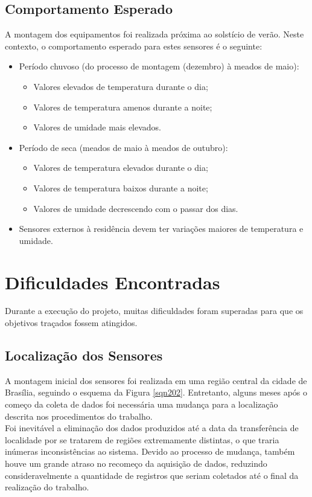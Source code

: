 
\subsection{Comportamento Esperado}
\quad A montagem dos equipamentos foi realizada próxima ao solstício de verão. Neste contexto, o comportamento esperado para estes sensores é o seguinte:
\begin{itemize}
  \item Período chuvoso (do processo de montagem (dezembro) à meados de maio):
  \begin{itemize}
    \item Valores elevados de temperatura durante o dia;
    \item Valores de temperatura amenos durante a noite;
    \item Valores de umidade mais elevados.

  \end{itemize}
  \item Período de seca (meados de maio à meados de outubro):
  \begin{itemize}
    \item Valores de temperatura elevados durante o dia;
    \item Valores de temperatura baixos durante a noite;
    \item Valores de umidade decrescendo com o passar dos dias.
  \end{itemize}
  \item Sensores externos à residência devem ter variações maiores de temperatura e umidade.
\end{itemize}

\section{Dificuldades Encontradas}
\quad Durante a execução do projeto, muitas dificuldades foram superadas para que os objetivos traçados fossem atingidos.
\subsection{Localização dos Sensores}
\quad A montagem inicial dos sensores foi realizada em uma região central da cidade de Brasília, seguindo o esquema da Figura \ref{sqn202}. Entretanto, alguns meses após o começo da coleta de dados foi necessária uma mudança para a localização descrita nos procedimentos do trabalho.
\\\null \quad Foi inevitável a eliminação dos dados produzidos até a data da transferência de localidade por se tratarem de regiões extremamente distintas, o que traria inúmeras inconsistências ao sistema. Devido ao processo de mudança, também houve um grande atraso no recomeço da aquisição de dados, reduzindo consideravelmente a quantidade de registros que seriam coletados até o final da realização do trabalho.

